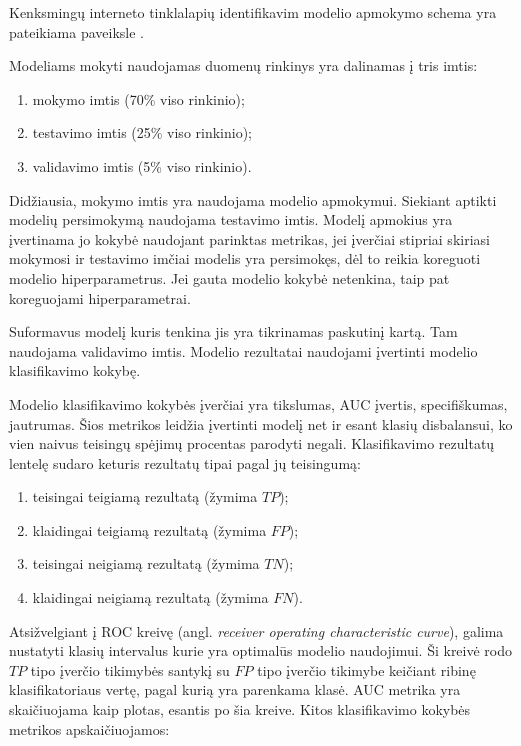 
Kenksmingų interneto tinklalapių identifikavim modelio apmokymo schema yra pateikiama paveiksle .

Modeliams mokyti naudojamas duomenų rinkinys yra dalinamas į tris imtis:
\begin{enumerate}
    \item mokymo imtis (70\% viso rinkinio);
    \item testavimo imtis (25\% viso rinkinio);
    \item validavimo imtis (5\% viso rinkinio).
\end{enumerate}
Didžiausia, mokymo imtis yra naudojama modelio apmokymui. Siekiant aptikti modelių persimokymą naudojama
testavimo imtis. Modelį apmokius yra įvertinama jo kokybė naudojant parinktas metrikas, jei įverčiai stipriai
skiriasi mokymosi ir testavimo imčiai modelis yra persimokęs, dėl to reikia koreguoti modelio hiperparametrus.
Jei gauta modelio kokybė netenkina,  taip pat koreguojami hiperparametrai.

Suformavus modelį kuris tenkina jis yra tikrinamas paskutinį kartą. Tam naudojama validavimo imtis.
Modelio rezultatai naudojami įvertinti modelio klasifikavimo kokybę.


Modelio klasifikavimo kokybės įverčiai yra tikslumas, AUC įvertis, specifiškumas, jautrumas. Šios metrikos leidžia
 įvertinti modelį net ir esant klasių disbalansui, ko vien naivus teisingų spėjimų procentas parodyti
  negali. Klasifikavimo rezultatų lentelę sudaro keturis rezultatų tipai pagal jų teisingumą:
\begin{enumerate}
    \item teisingai teigiamą rezultatą (žymima $TP$);
    \item klaidingai teigiamą rezultatą (žymima $FP$);
    \item teisingai neigiamą rezultatą (žymima $TN$);
    \item klaidingai neigiamą rezultatą (žymima $FN$).
\end{enumerate}

 Atsižvelgiant į ROC kreivę
(angl. \textit{receiver operating characteristic curve}), galima nustatyti
klasių intervalus kurie yra optimalūs modelio naudojimui. Ši kreivė rodo $TP$ tipo įverčio
tikimybės santykį su $FP$ tipo įverčio tikimybe keičiant ribinę klasifikatoriaus vertę, pagal
kurią yra parenkama klasė. AUC metrika yra skaičiuojama kaip plotas, esantis po šia kreive.
Kitos klasifikavimo kokybės metrikos apskaičiuojamos:

